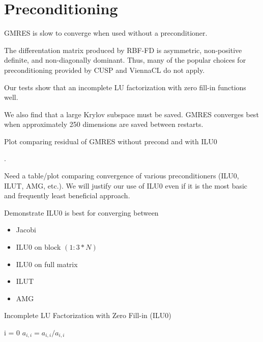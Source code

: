 \section{Preconditioning} 

GMRES is slow to converge when used without a preconditioner. 

The differentation matrix produced by RBF-FD is asymmetric, non-positive definite, and non-diagonally dominant. Thus, many of the popular choices for preconditioning provided by CUSP and ViennaCL do not apply. 

Our tests show that an incomplete LU factorization with zero fill-in \cite{Saad2003} functions well. 

We also find that a large Krylov subspace must be saved. GMRES converges best when approximately 250 dimensions are saved between restarts. 

{\color{blue} Plot comparing residual of GMRES without precond and with ILU0 }

.

Need a table/plot comparing convergence of various preconditioners (ILU0, ILUT, AMG, etc.). We will justify our use of ILU0 even if it is the most basic and frequently least beneficial approach.

Demonstrate ILU0 is best for converging between 
\begin{itemize}
\item Jacobi
\item ILU0 on block $(1:3*N)$
\item ILU0 on full matrix
\item ILUT
\item AMG 
\end{itemize} 

\begin{algorithm}                     
\caption{Incomplete LU Factorization with Zero Fill-in (ILU0)}         
\label{alg:gmres}                        
\begin{algorithmic}[1]                  
    \For i = 0
    \State $a_{i,i} = a_{i,i} / a_{i,i}$
    \EndFor
\end{algorithmic}
\end{algorithm}

